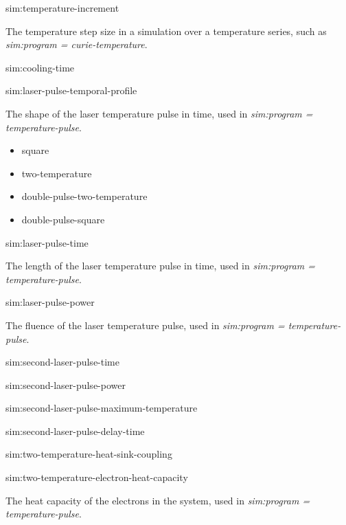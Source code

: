 {\zicf sim:temperature-increment} The temperature step size in a simulation over a temperature series, such as \textit{sim:program = curie-temperature}.

{\zicf sim:cooling-time}

{\zicf sim:laser-pulse-temporal-profile} The shape of the laser temperature pulse in time, used in \textit{sim:program = temperature-pulse}.

\begin{itemize}
   \item[] square
   \item[] two-temperature
   \item[] double-pulse-two-temperature
   \item[] double-pulse-square
\end{itemize}

{\zicf sim:laser-pulse-time} The length of the laser temperature pulse in time, used in \textit{sim:program = temperature-pulse}.

{\zicf sim:laser-pulse-power} The fluence of the laser temperature pulse, used in \textit{sim:program = temperature-pulse}.

{\zicf sim:second-laser-pulse-time}

{\zicf sim:second-laser-pulse-power}

{\zicf sim:second-laser-pulse-maximum-temperature}

{\zicf sim:second-laser-pulse-delay-time}

{\zicf sim:two-temperature-heat-sink-coupling}

{\zicf sim:two-temperature-electron-heat-capacity} The heat capacity of the electrons in the system, used in \textit{sim:program = temperature-pulse}.

